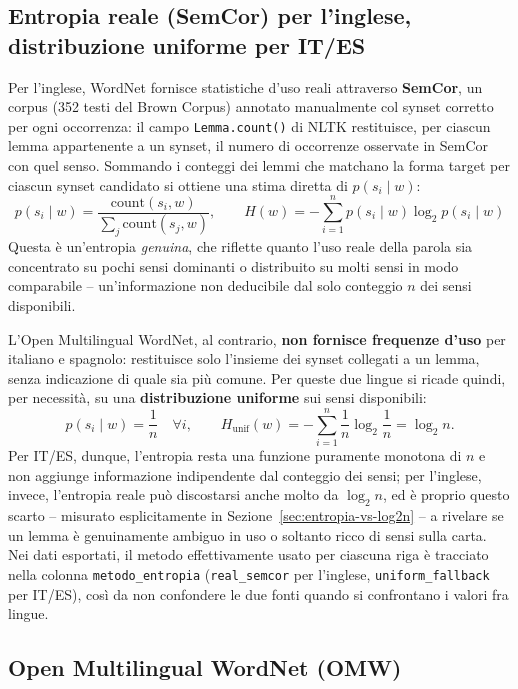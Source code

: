 \documentclass[12pt,a4paper]{article}
\begin{document}
\subsection{Entropia reale (SemCor) per l'inglese, distribuzione uniforme per IT/ES}
\label{sec:entropia-metodo}

Per l'inglese, WordNet fornisce statistiche d'uso reali attraverso \textbf{SemCor}, un corpus (352 testi del Brown Corpus) annotato manualmente col synset corretto per ogni occorrenza: il campo \texttt{Lemma.count()} di NLTK restituisce, per ciascun lemma appartenente a un synset, il numero di occorrenze osservate in SemCor con quel senso. Sommando i conteggi dei lemmi che matchano la forma target per ciascun synset candidato si ottiene una stima diretta di $p(s_i \mid w)$:
\[
  p(s_i \mid w) = \frac{\text{count}(s_i, w)}{\sum_j \text{count}(s_j, w)}, \qquad H(w) = -\sum_{i=1}^{n} p(s_i \mid w) \log_2 p(s_i \mid w)
\]
Questa \`e un'entropia \emph{genuina}, che riflette quanto l'uso reale della parola sia concentrato su pochi sensi dominanti o distribuito su molti sensi in modo comparabile -- un'informazione non deducibile dal solo conteggio $n$ dei sensi disponibili.

L'Open Multilingual WordNet, al contrario, \textbf{non fornisce frequenze d'uso} per italiano e spagnolo: restituisce solo l'insieme dei synset collegati a un lemma, senza indicazione di quale sia pi\`u comune. Per queste due lingue si ricade quindi, per necessit\`a, su una \textbf{distribuzione uniforme} sui sensi disponibili:
\[
  p(s_i \mid w) = \frac{1}{n} \quad \forall i, \qquad H_{\text{unif}}(w) = -\sum_{i=1}^{n} \frac{1}{n}\log_2\frac{1}{n} = \log_2 n.
\]
Per IT/ES, dunque, l'entropia resta una funzione puramente monotona di $n$ e non aggiunge informazione indipendente dal conteggio dei sensi; per l'inglese, invece, l'entropia reale pu\`o discostarsi anche molto da $\log_2 n$, ed \`e proprio questo scarto -- misurato esplicitamente in Sezione~\ref{sec:entropia-vs-log2n} -- a rivelare se un lemma \`e genuinamente ambiguo in uso o soltanto ricco di sensi sulla carta. Nei dati esportati, il metodo effettivamente usato per ciascuna riga \`e tracciato nella colonna \texttt{metodo\_entropia} (\texttt{real\_semcor} per l'inglese, \texttt{uniform\_fallback} per IT/ES), cos\`i da non confondere le due fonti quando si confrontano i valori fra lingue.

\subsection{Open Multilingual WordNet (OMW)}
\end{document}
